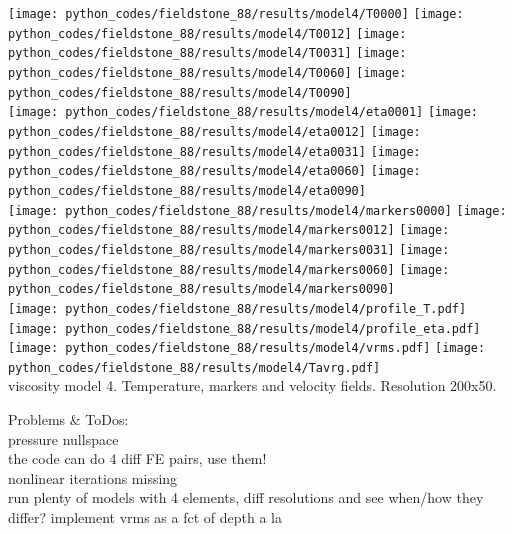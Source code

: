 \begin{center}
\texttt{[image: python\_codes/fieldstone\_88/results/model4/T0000]}
\texttt{[image: python\_codes/fieldstone\_88/results/model4/T0012]}
\texttt{[image: python\_codes/fieldstone\_88/results/model4/T0031]}
\texttt{[image: python\_codes/fieldstone\_88/results/model4/T0060]}
\texttt{[image: python\_codes/fieldstone\_88/results/model4/T0090]}\\
\texttt{[image: python\_codes/fieldstone\_88/results/model4/eta0001]}
\texttt{[image: python\_codes/fieldstone\_88/results/model4/eta0012]}
\texttt{[image: python\_codes/fieldstone\_88/results/model4/eta0031]}
\texttt{[image: python\_codes/fieldstone\_88/results/model4/eta0060]}
\texttt{[image: python\_codes/fieldstone\_88/results/model4/eta0090]}\\
\texttt{[image: python\_codes/fieldstone\_88/results/model4/markers0000]}
\texttt{[image: python\_codes/fieldstone\_88/results/model4/markers0012]}
\texttt{[image: python\_codes/fieldstone\_88/results/model4/markers0031]}
\texttt{[image: python\_codes/fieldstone\_88/results/model4/markers0060]}
\texttt{[image: python\_codes/fieldstone\_88/results/model4/markers0090]}\\
\texttt{[image: python\_codes/fieldstone\_88/results/model4/profile\_T.pdf]}
\texttt{[image: python\_codes/fieldstone\_88/results/model4/profile\_eta.pdf]}
\texttt{[image: python\_codes/fieldstone\_88/results/model4/vrms.pdf]}
\texttt{[image: python\_codes/fieldstone\_88/results/model4/Tavrg.pdf]}\\
{\captionfont viscosity model 4. Temperature, markers and velocity fields. Resolution 200x50.}
\end{center} 







\vspace{2cm}

Problems \& ToDos: \\
pressure nullspace \\
the code can do 4 diff FE pairs, use them!\\
nonlinear iterations missing\\
run plenty of models with 4 elements, diff resolutions and see when/how they differ?
implement vrms as a fct of depth a la \cite{king15}
